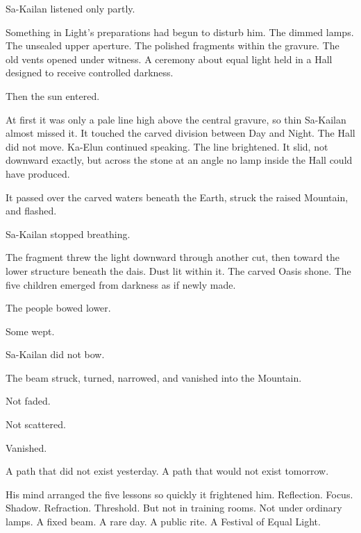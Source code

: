 Sa-Kailan listened only partly.\par

Something in Light’s preparations had begun to disturb him. The dimmed lamps. The unsealed upper aperture. The polished fragments within the gravure. The old vents opened under witness. A ceremony about equal light held in a Hall designed to receive controlled darkness.\par

Then the sun entered.\par

At first it was only a pale line high above the central gravure, so thin Sa-Kailan almost missed it. It touched the carved division between Day and Night. The Hall did not move. Ka-Elun continued speaking. The line brightened. It slid, not downward exactly, but across the stone at an angle no lamp inside the Hall could have produced.\par

It passed over the carved waters beneath the Earth, struck the raised Mountain, and flashed.\par

Sa-Kailan stopped breathing.\par

The fragment threw the light downward through another cut, then toward the lower structure beneath the dais. Dust lit within it. The carved Oasis shone. The five children emerged from darkness as if newly made.\par

The people bowed lower.\par

Some wept.\par

Sa-Kailan did not bow.\par

The beam struck, turned, narrowed, and vanished into the Mountain.\par

Not faded.\par

Not scattered.\par

Vanished.\par

A path that did not exist yesterday. A path that would not exist tomorrow.\par

His mind arranged the five lessons so quickly it frightened him. Reflection. Focus. Shadow. Refraction. Threshold. But not in training rooms. Not under ordinary lamps. A fixed beam. A rare day. A public rite. A Festival of Equal Light.\par

